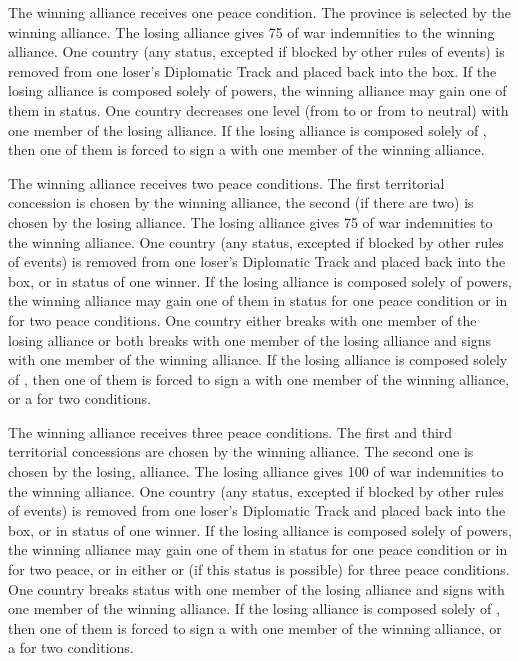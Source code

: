  The winning alliance receives one peace
condition.
 The province is selected by the winning
alliance. 
\bparag[Indemnities] The losing alliance gives 75 \ducats of war indemnities
to the winning alliance.
 One country (any status, excepted if
blocked by other rules of events) is removed from one loser's Diplomatic Track
and placed back into the \Neutral box. If the losing alliance is composed
solely of \MIN powers, the winning alliance may gain one of them in \MR
status.
 One \ROTW country decreases one level
(from \dipAT to \dipFR or from \dipFR to neutral) with one member of the losing
alliance. If the losing alliance is composed solely of \MIN, then one of them
is forced to sign a \dipFR with one member of the winning alliance.

 The winning alliance receives two peace conditions.
 The first territorial concession is chosen by
the winning alliance, the second (if there are two) is chosen by the losing
alliance.
\bparag[Indemnities] The losing alliance gives 75 \ducats of war indemnities
to the winning alliance.
 One country (any status, excepted if blocked
by other rules of events) is removed from one loser's Diplomatic Track and
placed back into the \Neutral box, or in \MR status of one winner. If the
losing alliance is composed solely of \MIN powers, the winning alliance may
gain one of them in \MR status for one peace condition or in \AM for two peace
conditions.
 One \ROTW country either breaks \dipAT with
one member of the losing alliance or both breaks \dipFR with one member of the
losing alliance and signs \dipFR with one member of the winning alliance. If the
losing alliance is composed solely of \MIN, then one of them is forced to sign
a \dipFR with one member of the winning alliance, or a \dipAT for two conditions.

 The winning alliance receives three peace
conditions.
 The first and third territorial concessions
are chosen by the winning alliance. The second one is chosen by the losing,
alliance.
\bparag[Indemnities] The losing alliance gives 100 \ducats of war indemnities
to the winning alliance.
 One country (any status, excepted if blocked
by other rules of events) is removed from one loser's Diplomatic Track and
placed back into the \Neutral box, or in \MR status of one winner. If the
losing alliance is composed solely of \MIN powers, the winning alliance may
gain one of them in \MR status for one peace condition or in \AM for two
peace, or in either \EG or \VASSAL (if this status is possible) for three
peace conditions.
 One \ROTW country breaks status with one
member of the losing alliance and signs \dipFR with one member of the winning
alliance. If the losing alliance is composed solely of \MIN, then one of them
is forced to sign a \dipFR with one member of the winning alliance, or a
\dipAT for two conditions.

